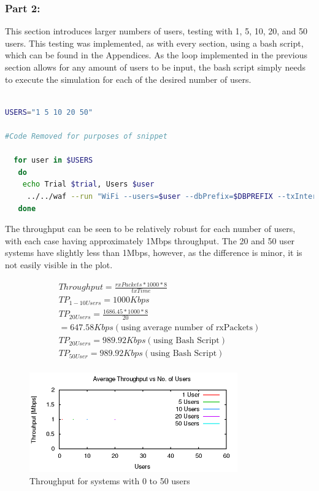 \subsubsection{Part 2:}

This section introduces larger numbers of users, testing with 1, 5, 10, 20, and
50 users. This testing was implemented, as with every section, using a bash
script, which can be found in the Appendices. As the loop implemented in the
previous section allows for any amount of users to be input, the bash script
simply needs to execute the simulation for each of the desired number of users.

\begin{lstlisting}[language=Bash, caption=wifi-p1qcp2.sh File Snippet]

USERS="1 5 10 20 50"

#Code Removed for purposes of snippet

  for user in $USERS
   do
    echo Trial $trial, Users $user
     ../../waf --run "WiFi --users=$user --dbPrefix=$DBPREFIX --txInterval=$TXINTERVAL --run=run-$trial-$DBPREFIX-$user"
   done
\end{lstlisting}

The throughput can be seen to be relatively robust for each number of users,
with each case having approximately 1Mbps throughput. The 20 and 50 user systems
have slightly less than 1Mbps, however, as the difference is minor, it is not
easily visible in the plot.

\begin{gather*}
	Throughput=\frac{rxPackets*1000*8}{txTime} \\
	TP_{1-10 Users}= 1000Kbps\\
	TP_{20 Users}= \frac{1686.45*1000*8}{20}\\
	= 647.58Kbps (\text{using average number of rxPackets}) \\
	TP_{20 Users} = 989.92Kbps (\text{using Bash Script}) \\
	TP_{50 User}= 989.92Kbps (\text{using Bash Script}) \\
\end{gather*}

\begin{figure}[H]
	\centering
	\includegraphics[width=0.8\textwidth]{images/EE500/QC/P2/Images/wifi-throughput}
	\caption{Throughput for systems with 0 to 50 users}
	\label{fig:QCP2throughput}
\end{figure}

